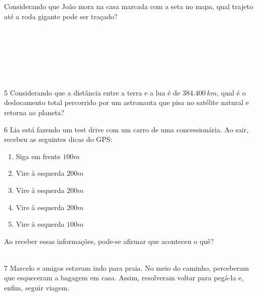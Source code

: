 
Considerando que João mora na casa marcada com a seta no mapa, qual
trajeto até a roda gigante pode ser traçado?

\\
\\
\\
\\
\\
\\

\num{5} Considerando que a distância entre a terra e a lua é de $384.400\,km$,
qual é o deslocamento total percorrido por um astronauta que pisa no
satélite natural e retorna ao planeta?



\num{6} Lia está fazendo um test drive com um carro de uma concessionária. Ao
sair, recebeu as seguintes dicas do GPS:

\begin{enumerate}[itemsep=0pt]
\item Siga em frente  $100 m$
\item Vire à esquerda $200 m$
\item Vire à esquerda $200 m$
\item Vire à esquerda $200 m$
\item Vire à esquerda $100 m$
\end{enumerate}

Ao receber essas informações, pode-se afirmar que aconteceu o quê?

\\

\num{7} Marcelo e amigos estavam indo para praia. No meio do caminho,
perceberam que esqueceram a bagagem em casa. Assim, resolveram voltar
para pegá-la e, enfim, seguir viagem.

